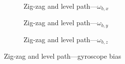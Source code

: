 \begin{figure}[H]
    \centering
    \begin{subfigure}{0.3\textwidth}
        
        \caption{Zig-zag and level path---$\omega_{b,x}$}
    \end{subfigure}
    \hfill
    \begin{subfigure}{0.3\textwidth}
        
        \caption{Zig-zag and level path---$\omega_{b,y}$}
    \end{subfigure}
    \hfill
    \begin{subfigure}{0.3\textwidth}
        
        \caption{Zig-zag and level path---$\omega_{b,z}$}
    \end{subfigure}
    \caption{Zig-zag and level path---gyroscope bias}\label{fig:zig-zag-level-gbias}
\end{figure}